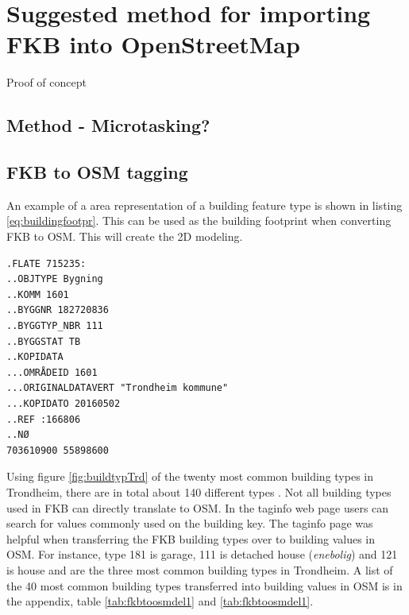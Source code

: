\chapter{Suggested method for importing FKB into OpenStreetMap}
Proof of concept 

\section{Method - Microtasking?}



\section{FKB to OSM tagging}

An example of a area representation of a building feature type is shown in listing \ref{eq:buildingfootpr}. This can be used as the building footprint when converting FKB to OSM. This will create the 2D modeling. 

\begin{lstlisting}
.FLATE 715235:
..OBJTYPE Bygning
..KOMM 1601
..BYGGNR 182720836
..BYGGTYP_NBR 111
..BYGGSTAT TB
..KOPIDATA
...OMRÅDEID 1601
...ORIGINALDATAVERT "Trondheim kommune"
...KOPIDATO 20160502
..REF :166806
..NØ
703610900 55898600
\end{lstlisting}

Using figure \ref{fig:buildtypTrd} of the twenty most common building types in Trondheim, there are in total about 140 different types \cite{SOSI-sekretariatet}. Not all building types used in FKB can directly translate to OSM. In the taginfo web page users can search for values commonly used on the building key. The taginfo page was helpful when transferring the FKB building types over to building values in OSM. For instance, type 181 is garage, 111 is detached house (\textit{enebolig}) and 121 is house and are the three most common building types in Trondheim. A list of the 40 most common building types transferred into building values in OSM is in the appendix, table \ref{tab:fkbtoosmdel1} and \ref{tab:fkbtoosmdel1}. 

